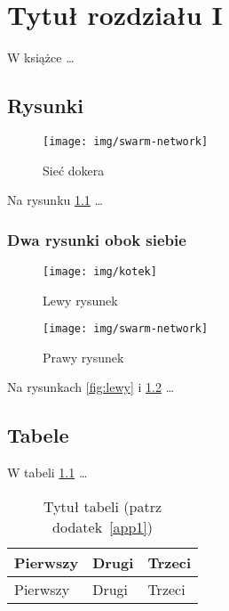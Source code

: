 
\chapter{Tytuł rozdziału I}

W książce \cite{docker_compose_reference} \dots



\section{Rysunki}

\begin{figure}
\centering\texttt{[image: img/swarm-network]}
\caption{Sieć dokera \cite{docker_compose_reference}}  \label{rys:network}
\end{figure}

Na rysunku \ref{rys:network} \dots


\subsection{Dwa rysunki obok siebie}

\begin{figure}[ht] 
	\centering
	\begin{minipage}[b]{0.45\textwidth}
		\centering\texttt{[image: img/kotek]} %
		\caption{Lewy rysunek}\label{fig:lewy}
	\end{minipage}
	\begin{minipage}[b]{0.45\textwidth}
		\centering
		\texttt{[image: img/swarm-network]} %
		\caption{Prawy rysunek}\label{fig:prawy}
	\end{minipage}
\end{figure}

Na rysunkach \ref{fig:lewy} i \ref{fig:prawy} \dots


\section{Tabele}

W tabeli \ref{table:table1} \dots

\begin{table}
\centering\caption{Tytuł tabeli (patrz dodatek~\ref{app1}) \label{table:table1}}
\begin{tabular}{|l|l|l|}%
\hline
Pierwszy & Drugi & Trzeci \\
\hline
Pierwszy & Drugi & Trzeci \\
\hline
\end{tabular}
\end{table}

